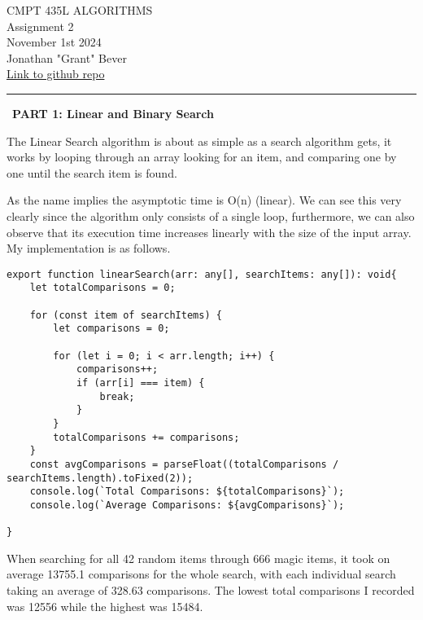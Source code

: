 \documentclass[12pt,letterpaper, onecolumn]{exam}
\begin{document}
\begingroup  
    \centering
    \LARGE CMPT 435L ALGORITHMS\\
    \LARGE Assignment 2\\[0.5em]
    \large November 1st 2024 \\[0.5em]
    \large Jonathan "Grant" Bever\\[0.5em]
    
    \small\href{https://github.com/Grant-Bever/CMPT435L_Algo}{Link to github repo}
    \par
\endgroup
\rule{\textwidth}{0.3pt}


\noindent\ \textbf{PART 1: Linear and Binary Search}
\vspace{.5cm}

\noindent \centering The Linear Search algorithm is about as simple as a search algorithm gets, it works by looping through an array looking for an item, and comparing one by one until the search item is found. 

\vspace{.2cm}

\centering As the name implies the asymptotic time is O(n) (linear). We can see this very clearly since the algorithm only consists of a single loop, furthermore, we can also observe that its execution time increases linearly with the size of the input array. My implementation is as follows.


\vspace{.2cm}

\begin{lstlisting}
export function linearSearch(arr: any[], searchItems: any[]): void{
    let totalComparisons = 0;

    for (const item of searchItems) {
        let comparisons = 0;

        for (let i = 0; i < arr.length; i++) {
            comparisons++;  
            if (arr[i] === item) {
                break;
            }
        }
        totalComparisons += comparisons;
    }
    const avgComparisons = parseFloat((totalComparisons / searchItems.length).toFixed(2));
    console.log(`Total Comparisons: ${totalComparisons}`);
    console.log(`Average Comparisons: ${avgComparisons}`);

}
\end{lstlisting}

\centering When searching for all 42 random items through 666 magic items, it took on average 13755.1 comparisons for the whole search, with each individual search taking an average of 328.63 comparisons. The lowest total comparisons I recorded was 12556 while the highest was 15484. 
\end{document}
